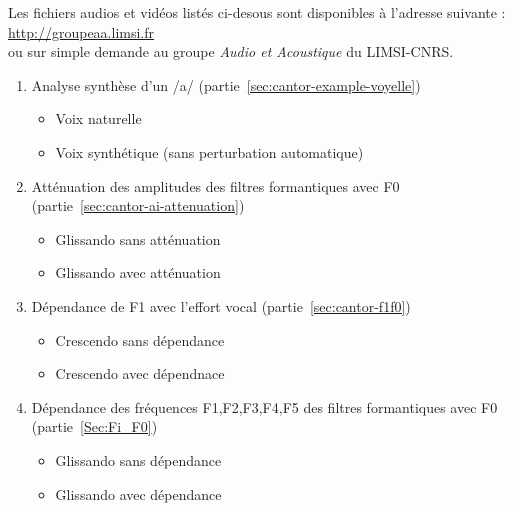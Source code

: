 
\noindent Les fichiers audios et vidéos listés ci-desous sont disponibles à l'adresse suivante :\\ \url{http://groupeaa.limsi.fr}\\
ou sur simple demande au groupe \textit{Audio et Acoustique} du LIMSI-CNRS.

\begin{enumerate}


\section*{Chapitre~\ref{Sec:CantorDigitalis} : Cantor Digitalis}


\item    Analyse synthèse d'un /a/ (partie~\ref{sec:cantor-example-voyelle})
\label{fav:natsyn}
		\begin{itemize}
		    \item Voix naturelle
       		\item Voix synthétique (sans perturbation automatique)
        \end{itemize}
\item    Atténuation des amplitudes des filtres formantiques avec F0 (partie~\ref{sec:cantor-ai-attenuation})
\label{fav:ai-attenuation}
		\begin{itemize}
        \item Glissando sans atténuation
        \item Glissando avec atténuation
        \end{itemize}
\item    Dépendance de F1 avec l'effort vocal (partie~\ref{sec:cantor-f1f0})
\label{fav:f1-VE-dependance}
		\begin{itemize}
        \item Crescendo sans dépendance
        \item Crescendo avec dépendnace
         \end{itemize}
\item    Dépendance des fréquences {F1,F2,F3,F4,F5} des filtres formantiques avec F0 (partie~\ref{Sec:Fi_F0})
\label{fav:fi-f0-dependance}
		\begin{itemize}
        \item Glissando sans dépendance
        \item Glissando avec dépendance
        \end{itemize}

\end{enumerate}

